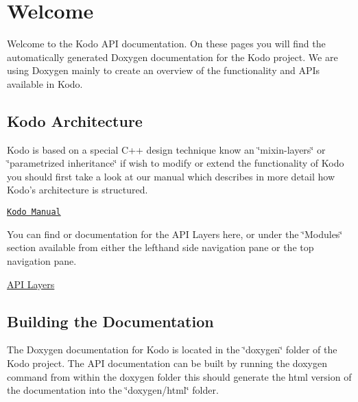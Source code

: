 \hypertarget{index_Welcome}{}\section{Welcome}\label{index_Welcome}
Welcome to the Kodo A\-P\-I documentation. On these pages you will find the automatically generated Doxygen documentation for the Kodo project. We are using Doxygen mainly to create an overview of the functionality and A\-P\-Is available in Kodo.\hypertarget{index_kodo_arch}{}\subsection{Kodo Architecture}\label{index_kodo_arch}
Kodo is based on a special C++ design technique know an \char`\"{}mixin-\/layers\char`\"{} or \char`\"{}parametrized inheritance\char`\"{} if wish to modify or extend the functionality of Kodo you should first take a look at our manual which describes in more detail how Kodo's architecture is structured.


\begin{DoxyItemize}
\item \href{https://kodo.readthedocs.org/en/latest/}{\tt Kodo Manual}
\end{DoxyItemize}

You can find or documentation for the A\-P\-I Layers here, or under the \char`\"{}\-Modules\char`\"{} section available from either the lefthand side navigation pane or the top navigation pane.


\begin{DoxyItemize}
\item \hyperlink{group__api__layer}{A\-P\-I Layers}
\end{DoxyItemize}\hypertarget{index_building_docs}{}\subsection{Building the Documentation}\label{index_building_docs}
The Doxygen documentation for Kodo is located in the \char`\"{}doxygen\char`\"{} folder of the Kodo project. The A\-P\-I documentation can be built by running the doxygen command from within the doxygen folder this should generate the html version of the documentation into the \char`\"{}doxygen/html\char`\"{} folder. 